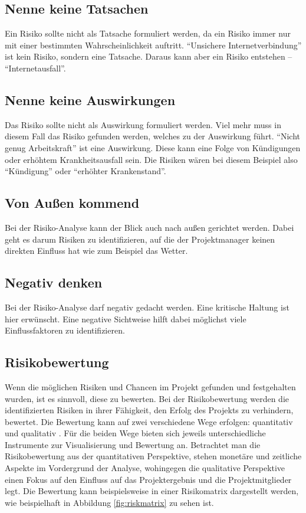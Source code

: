 \documentclass[ThesisDJ.tex]{subfiles}
\begin{document}
\subsection{Nenne keine Tatsachen}

Ein Risiko sollte nicht als Tatsache formuliert werden, da ein Risiko immer nur mit einer bestimmten Wahrscheinlichkeit auftritt. “Unsichere Internetverbindung” ist kein Risiko, sondern eine Tatsache. Daraus kann aber ein Risiko entstehen – “Internetausfall”.

\subsection{Nenne keine Auswirkungen}

Das Risiko sollte nicht als Auswirkung formuliert werden. Viel mehr muss in diesem Fall das Risiko gefunden werden, welches zu der Auswirkung führt. “Nicht genug  Arbeitskraft” ist eine Auswirkung. Diese kann eine Folge von Kündigungen oder erhöhtem Krankheitsausfall sein. Die Risiken wären bei diesem Beispiel also “Kündigung” oder “erhöhter Krankenstand”.


\subsection{Von Außen kommend}

Bei der Risiko-Analyse kann der Blick auch nach außen gerichtet werden. Dabei geht es darum Risiken zu identifizieren, auf die der Projektmanager keinen direkten Einfluss hat wie zum Beispiel das Wetter. 

\subsection{Negativ denken}

Bei der Risiko-Analyse darf negativ gedacht werden. Eine kritische Haltung ist hier erwünscht. Eine negative Sichtweise hilft dabei möglichst viele Einflussfaktoren zu identifizieren.


\subsection{Risikobewertung}
Wenn die möglichen Risiken und Chancen im Projekt gefunden und festgehalten wurden, ist es sinnvoll, diese zu bewerten. Bei der Risikobewertung werden die identifizierten Risiken in ihrer Fähigkeit, den Erfolg des Projekts zu verhindern, bewertet. Die Bewertung kann auf zwei verschiedene Wege erfolgen: quantitativ und qualitativ \cite[S.~300 ff.]{patzak2017projektmanagement}. Für die beiden Wege bieten sich jeweils unterschiedliche Instrumente zur Visualisierung und Bewertung an. Betrachtet man die Risikobewertung aus der quantitativen Perspektive, stehen monetäre und zeitliche Aspekte im Vordergrund der Analyse, wohingegen die qualitative Perspektive einen Fokus auf den Einfluss auf das Projektergebnis und die Projektmitglieder legt. Die Bewertung kann beispielsweise in einer Risikomatrix dargestellt werden, wie beispielhaft in Abbildung \ref{fig:riskmatrix}\cite[S.~24]{cicek2022risikomanagement} zu sehen ist.
\end{document}
